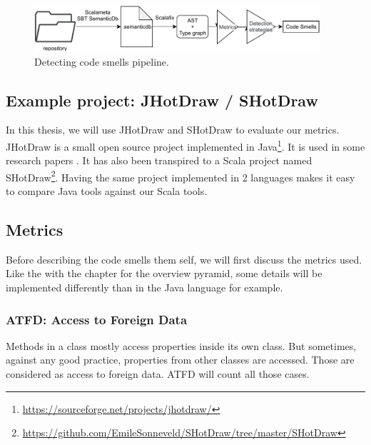 \documentclass[onecolumn]{article}
\begin{document}
\begin{figure}[H]
  \centering
  \includegraphics[width=300pt]{fig/architecture-code_smells_pipeline.pdf}
  \caption{Detecting code smells pipeline.}
  \label{fig:architecture-code_smells_pipeline}
\end{figure}

\subsection{Example project: JHotDraw / SHotDraw} \label{section_SHotDraw}
In this thesis, we will use JHotDraw and SHotDraw to evaluate our metrics.
JHotDraw is a small open source project implemented in Java\footnote{\url{https://sourceforge.net/projects/jhotdraw/}}. It is used in some research papers \cite{barkmann2009quantitative} \cite{marin2007integrated}. It has also been transpired to a Scala project named SHotDraw\footnote{\url{https://github.com/EmileSonneveld/SHotDraw/tree/master/SHotDraw}}.
Having the same project implemented in 2 languages makes it easy to compare Java tools against our Scala tools.


\subsection{Metrics}
Before describing the code smells them self, we will first discuss the metrics used. Like the with the chapter for the overview pyramid, some details will be implemented differently than in the Java language for example. 

\subsubsection{ATFD: Access to Foreign Data} \label{metric_ATFD}
Methods in a class mostly access properties inside its own class. But sometimes, against any good practice, properties from other classes are accessed. Those are considered as access to foreign data. ATFD will count all those cases.
\end{document}
